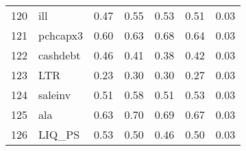 \documentclass[12pt]{article}
\begin{document}
\begin{footnotesize}
\begin{longtable}{rl|c|c|c|c|c}
120 & ill              & 0.47                                                                                      & 0.55                                                                                        & 0.53                                                                                         & 0.51 & 0.03               \\
121 & pchcapx3         & 0.60                                                                                      & 0.63                                                                                        & 0.68                                                                                         & 0.64 & 0.03               \\
122 & cashdebt         & 0.46                                                                                      & 0.41                                                                                        & 0.38                                                                                         & 0.42 & 0.03               \\
123 & LTR              & 0.23                                                                                      & 0.30                                                                                        & 0.30                                                                                         & 0.27 & 0.03               \\
124 & saleinv          & 0.51                                                                                      & 0.58                                                                                        & 0.51                                                                                         & 0.53 & 0.03               \\
125 & ala              & 0.63                                                                                      & 0.70                                                                                        & 0.69                                                                                         & 0.67 & 0.03               \\
126 & LIQ\_PS          & 0.53                                                                                      & 0.50                                                                                        & 0.46                                                                                         & 0.50 & 0.03               \\

\end{longtable}
\end{footnotesize}
\end{document}
